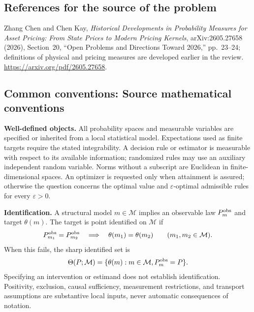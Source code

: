 \documentclass[11pt,a4paper]{article}
\begin{document}
\subsection*{References for the source of the problem}
Zhang Chen and Chen Kay, \emph{Historical Developments in Probability Measures for Asset Pricing: From State Prices to Modern Pricing Kernels}, arXiv:2605.27658 (2026), Section~20, ``Open Problems and Directions Toward 2026,'' pp.~23--24; definitions of physical and pricing measures are developed earlier in the review. \url{https://arxiv.org/pdf/2605.27658}.

\subsection*{Common conventions: Source mathematical conventions}

\textbf{Well-defined objects.}
All probability spaces and measurable variables are specified or inherited
from a local statistical model. Expectations used as finite targets require
the stated integrability. A decision rule or estimator is measurable with
respect to its available information; randomized rules may use an auxiliary
independent random variable. Norms without a subscript are Euclidean in
finite-dimensional spaces. An optimizer is requested only when attainment
is assured; otherwise the question concerns the optimal value and
$\varepsilon$-optimal admissible rules for every $\varepsilon>0$.

\textbf{Identification.}
A structural model $m\in\mathcal M$ implies an observable law
$P_m^{\rm obs}$ and target $\theta(m)$. The target is point identified on
$\mathcal M$ if
\[
 P_{m_1}^{\rm obs}=P_{m_2}^{\rm obs}
 \quad\Longrightarrow\quad\theta(m_1)=\theta(m_2)
 \qquad(m_1,m_2\in\mathcal M).
\]
When this fails, the sharp identified set is
\[
 \Theta(P;\mathcal M)=\{\theta(m):m\in\mathcal M,
                                  P_m^{\rm obs}=P\}.
\]
Specifying an intervention or estimand does not establish identification.
Positivity, exclusion, causal sufficiency, measurement restrictions, and
transport assumptions are substantive local inputs, never automatic
consequences of notation.
\end{document}

